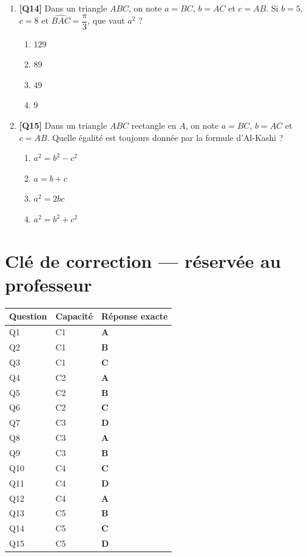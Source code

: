 \begin{enumerate}
\item \textbf{[Q14]} Dans un triangle $ABC$, on note $a=BC$, $b=AC$ et $c=AB$. Si $b=5$, $c=8$ et $\widehat{BAC}=\dfrac{\pi}{3}$, que vaut $a^2$ ?
  \begin{enumerate}[label=\Alph*.]
    \item $129$
    \item $89$
    \item $49$
    \item $9$
  \end{enumerate}

\item \textbf{[Q15]} Dans un triangle $ABC$ rectangle en $A$, on note $a=BC$, $b=AC$ et $c=AB$. Quelle égalité est toujours donnée par la formule d'Al-Kashi ?
  \begin{enumerate}[label=\Alph*.]
    \item $a^2 = b^2 - c^2$
    \item $a = b + c$
    \item $a^2 = 2bc$
    \item $a^2 = b^2 + c^2$
  \end{enumerate}

\end{enumerate}

\ifnxVersionProfesseur
\clearpage
\section*{Clé de correction — réservée au professeur}

\begin{center}
\begin{tabular}{lll}
\hline
Question & Capacité & Réponse exacte \\
\hline
Q1 & C1 & \textbf{A} \\
Q2 & C1 & \textbf{B} \\
Q3 & C1 & \textbf{C} \\
Q4 & C2 & \textbf{A} \\
Q5 & C2 & \textbf{B} \\
Q6 & C2 & \textbf{C} \\
Q7 & C3 & \textbf{D} \\
Q8 & C3 & \textbf{A} \\
Q9 & C3 & \textbf{B} \\
Q10 & C4 & \textbf{C} \\
Q11 & C4 & \textbf{D} \\
Q12 & C4 & \textbf{A} \\
Q13 & C5 & \textbf{B} \\
Q14 & C5 & \textbf{C} \\
Q15 & C5 & \textbf{D} \\
\hline
\end{tabular}
\end{center}

